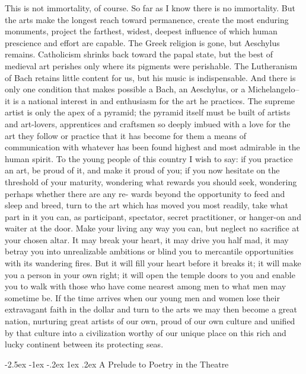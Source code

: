 \documentclass[9pt,twoside]{extarticle}
\makeatletter
\renewcommand\section{\@startsection{section}{1}{\z@}%
  {-2.5ex \@plus -1ex \@minus -.2ex}%
  {1ex \@plus .2ex}%
  {\itshape\normalsize}}
\makeatother
\begin{document}
This is not immortality, of course. So far as I know there is no immortality. But the arts make the longest reach toward permanence, create the most enduring monuments, project the farthest, widest, deepest influence of which human prescience and effort are capable. The Greek religion is gone, but Aeschylus remains. Catholicism shrinks back toward the papal state, but the best of medieval art perishes only where its pigments were perishable. The Lutheranism of Bach retains little content for us, but his music is indispensable. And there is only one condition that makes possible a Bach, an Aeschylus, or a Michelangelo--it is a national interest in and enthusiasm for the art he practices. The supreme artist is only the apex of a pyramid; the pyramid itself must be built of artists and art-lovers, apprentices and craftsmen so deeply imbued with a love for the art they follow or practice that it has become for them a means of communication with whatever has been found highest and most admirable in the human spirit. To the young people of this country I wish to say: if you practice an art, be proud of it, and make it proud of you; if you now hesitate on the threshold of your maturity, wondering what rewards you should seek, wondering perhaps whether there are any re- wards beyond the opportunity to feed and sleep and breed, turn to the art which has moved you most readily, take what part in it you can, as participant, spectator, secret practitioner, or hanger-on and waiter at the door. Make your living any way you can, but neglect no sacrifice at your chosen altar. It may break your heart, it may drive you half mad, it may betray you into unrealizable ambitions or blind you to mercantile opportunities with its wandering fires. But it will fill your heart before it breaks it; it will make you a person in your own right; it will open the temple doors to you and enable you to walk with those who have come nearest among men to what men may sometime be. If the time arrives when our young men and women lose their extravagant faith in the dollar and turn to the arts we may then become a great nation, nurturing great artists of our own, proud of our own culture and unified by that culture into a civilization worthy of our unique place on this rich and lucky continent between its protecting seas.

\newpage
\section{A Prelude to Poetry in the Theatre}
\end{document}
